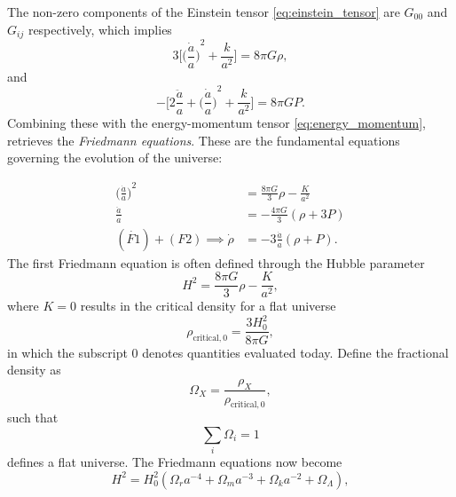 The non-zero components of the Einstein tensor \cref{eq:einstein_tensor} are \(G_{00}\) and \(G_{i j}\) respectively, which implies
%
\begin{equation}
    3\Bigg[ {\bigg(\frac{\dot{a}}{a}\bigg)}^{2} + \frac{k}{a^{2}} \Bigg]
    = 8\pi G\rho,
\end{equation}
%
and
%
\begin{equation}
    -\Bigg[ 2\frac{\ddot{a}}{a} + {\bigg(\frac{\dot{a}}{a}\bigg)}^{2} + \frac{k}{a^{2}} \Bigg]
    = 8\pi G P.
\end{equation}
%
Combining these with the energy-momentum tensor \cref{eq:energy_momentum}, retrieves the \emph{Friedmann equations}.
These are the fundamental equations governing the evolution of the universe:
%
\addtocounter{equation}{-1}
%
\begin{subequations}
	\begin{align}
		{\bigg(\frac{\dot{a}}{a}\bigg)}^{2}  & = \frac{8\pi G}{3} \rho - \frac{K}{a^{2}} \tag{F1} \label{eq:F1} \\
		\frac{\ddot{a}}{a}                    & = -\frac{4\pi G}{3}(\rho + 3P) \tag{F2}                          \\
		(\dot{F1}) + (F2) \implies \dot{\rho} & = -3\frac{\dot{a}}{a}(\rho + P). \tag{F3}
	\end{align}
\end{subequations}
%
The first Friedmann equation is often defined through the Hubble parameter
%
\begin{equation}
	H^{2}
    = \frac{8\pi G}{3} \rho - \frac{K}{a^{2}},
\end{equation}
%
where \(K=0\) results in the critical density for a flat universe
%
\begin{equation}
	\rho_{\text{critical},0}
    = \frac{3H_{0}^{2}}{8\pi G},
\end{equation}
%
in which the subscript \(0\) denotes quantities evaluated today.
Define the fractional density as
%
\begin{equation}
	\Omega_{X}
    = \frac{\rho_{X}}{\rho_{\text{critical},0}},
\end{equation}
%
such that
%
\begin{equation}
    \sum\limits_{i}\Omega_{i}
    = 1
\end{equation}
%
defines a flat universe.
The Friedmann equations now become
%
\begin{equation}
	H^{2}
    = H_{0}^{2} (\Omega_{r}a^{-4} + \Omega_{m}a^{-3} + \Omega_{k}a^{-2} + \Omega_{\Lambda}),
\end{equation}
